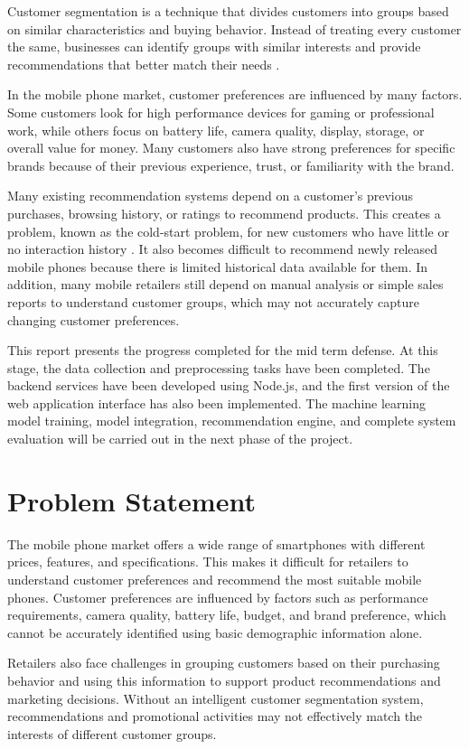 \documentclass[12pt, a4paper]{report}
\numberwithin{equation}{chapter}
\begin{document}
Customer segmentation is a technique that divides customers into groups based on similar characteristics and buying behavior. Instead of treating every customer the same, businesses can identify groups with similar interests and provide recommendations that better match their needs \cite{singh}.

In the mobile phone market, customer preferences are influenced by many factors. Some customers look for high performance devices for gaming or professional work, while others focus on battery life, camera quality, display, storage, or overall value for money. Many customers also have strong preferences for specific brands because of their previous experience, trust, or familiarity with the brand.

Many existing recommendation systems depend on a customer's previous purchases, browsing history, or ratings to recommend products. This creates a problem, known as the cold-start problem, for new customers who have little or no interaction history \cite{pandey}. It also becomes difficult to recommend newly released mobile phones because there is limited historical data available for them. In addition, many mobile retailers still depend on manual analysis or simple sales reports to understand customer groups, which may not accurately capture changing customer preferences.

This report presents the progress completed for the mid term defense. At this stage, the data collection and preprocessing tasks have been completed. The backend services have been developed using Node.js, and the first version of the web application interface has also been implemented. The machine learning model training, model integration, recommendation engine, and complete system evaluation will be carried out in the next phase of the project.

\section{Problem Statement}
The mobile phone market offers a wide range of smartphones with different prices, features, and specifications. This makes it difficult for retailers to understand customer preferences and recommend the most suitable mobile phones. Customer preferences are influenced by factors such as performance requirements, camera quality, battery life, budget, and brand preference, which cannot be accurately identified using basic demographic information alone.

Retailers also face challenges in grouping customers based on their purchasing behavior and using this information to support product recommendations and marketing decisions. Without an intelligent customer segmentation system, recommendations and promotional activities may not effectively match the interests of different customer groups.
\end{document}
